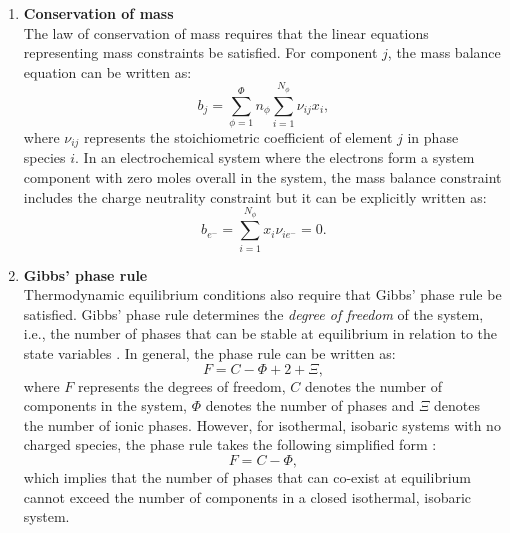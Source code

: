 	\begin{enumerate}
		\item \textbf{Conservation of mass}\\
			The law of conservation of mass requires that the linear equations representing mass constraints be satisfied. For component $j$, the mass balance equation can be written as:
			\begin{equation}\label{eq:massbalance}
				b_j = \sum_{\phi=1}^{\Phi} n_{\phi}\sum_{i=1}^{N_{\phi}} {\nu}_{ij} x_{i},
			\end{equation}
			where ${\nu}_{ij}$ represents the stoichiometric coefficient of element $j$ in phase species $i$. In an electrochemical system where the electrons form a system component with zero moles overall in the system, the mass balance constraint includes the charge neutrality constraint but it can be explicitly written as:
			\begin{equation}\label{eq:chargebalance}
				b_{e^-} = \sum_{i=1}^{N_{\phi}}x_{i}{\nu}_{i{e^-}} = 0.
			\end{equation} 
			
		\item \textbf{Gibbs' phase rule}\\
			Thermodynamic equilibrium conditions also require that  Gibbs' phase rule be satisfied. Gibbs' phase rule determines the \emph{degree of freedom} of the system, i.e., the number of phases that can be stable at equilibrium in relation to the state variables \cite{Gibbs:1878aa}. In general, the phase rule can be written as:
			\begin{equation}
                			F=C-\Phi + 2 + \Xi,
            		\end{equation}
            		where $F$ represents the degrees of freedom, $C$ denotes the number of components in the system, $\Phi$ denotes the number of phases and $\Xi$ denotes the number of ionic phases. However, for isothermal, isobaric systems with no charged species, the phase rule takes the following simplified form :
			\begin{equation}
                			F=C-\Phi,
            		\end{equation}
			which implies that the number of phases that can co-exist at equilibrium cannot exceed the number of components in a closed isothermal, isobaric system.
			

\end{enumerate}
